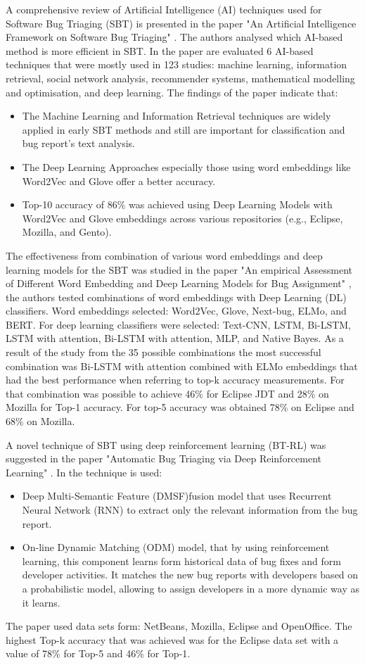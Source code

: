 		A comprehensive review of Artificial Intelligence (AI) techniques used for Software Bug Triaging (SBT) is presented in the paper "An Artificial Intelligence Framework on Software Bug Triaging" \cite{Nagwani2023} . The authors analysed which AI-based method is more efficient in SBT. In the paper are evaluated 6 AI-based techniques that were mostly used in 123 studies: machine learning, information retrieval, social network analysis, recommender systems, mathematical modelling and optimisation, and deep learning. The findings of the paper indicate that:
	\begin{itemize}
		\item The Machine Learning and Information Retrieval techniques are widely applied in early SBT methods and still are important for classification and bug report's text analysis.
		\item The Deep Learning Approaches especially those using word embeddings like Word2Vec and Glove offer a better accuracy. 
		\item Top-10 accuracy of 86\% was achieved using Deep Learning Models with Word2Vec and Glove embeddings across various repositories (e.g., Eclipse, Mozilla, and Gento). 
	\end{itemize}
	
		The effectiveness from combination of various word embeddings and deep learning models for the SBT was studied in the paper "An empirical Assessment of Different Word Embedding and Deep Learning Models for Bug Assignment" \cite{Huang2024}, the authors tested combinations of word embeddings with Deep Learning (DL) classifiers. Word embeddings selected: Word2Vec, Glove, Next-bug, ELMo, and BERT. For deep learning classifiers were selected: Text-CNN, LSTM, Bi-LSTM, LSTM with attention, Bi-LSTM with attention, MLP, and Native Bayes. As a result of the study from the 35 possible combinations the most successful combination was Bi-LSTM with attention combined with ELMo embeddings that had the best performance when referring to top-k accuracy measurements. For that combination was possible to achieve 46\% for Eclipse JDT and 28\% on Mozilla for Top-1 accuracy. For top-5 accuracy was obtained 78\% on Eclipse and 68\% on Mozilla. 
 
	A novel technique of SBT using deep reinforcement learning (BT-RL) was suggested in the paper "Automatic Bug Triaging via Deep Reinforcement Learning" \cite{Liu2022}.
	In the technique is used:
	\begin{itemize}
		\item Deep Multi-Semantic Feature (DMSF)fusion model that uses Recurrent Neural Network (RNN) to extract only the relevant information from the bug report.
		\item On-line Dynamic Matching (ODM) model, that by using reinforcement learning, this component learns form historical data of bug fixes and form developer activities. It matches the new bug reports with developers based on a probabilistic model, allowing to assign developers in a more dynamic way as it learns.
	\end{itemize}
	The paper used data sets form: NetBeans, Mozilla, Eclipse and OpenOffice. The highest Top-k accuracy that was achieved was for the Eclipse data set with a value of 78\% for Top-5 and 46\% for Top-1.

